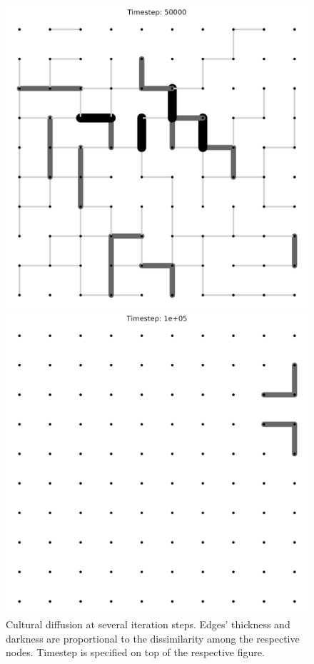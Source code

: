 \begin{figure}[htbp]
\begin{minipage}[t]{0.24\linewidth}
    \end{minipage}
    \hfill
    \begin{minipage}[t]{0.24\linewidth}
        \centering
        \includegraphics[width=\linewidth]{images/ax2.png}
        
    \end{minipage}
    \hfill
    \begin{minipage}[t]{0.24\linewidth}
        \centering
        \includegraphics[width=\linewidth]{images/ax3.png}
        
    \end{minipage}
    \caption{Cultural diffusion at several iteration steps. Edges' thickness and darkness are proportional to the dissimilarity among the respective nodes. Timestep is specified on top of the respective figure.}
    \label{fig:ax}
\end{figure}
